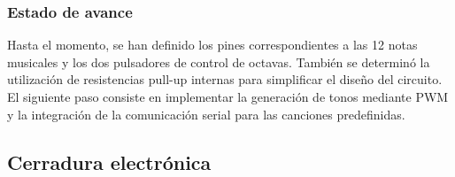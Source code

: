 \subsubsection{Estado de avance}
Hasta el momento, se han definido los pines correspondientes a las 12 notas musicales y los dos pulsadores de control de octavas. También se determinó la utilización de resistencias pull-up internas para simplificar el diseño del circuito. El siguiente paso consiste en implementar la generación de tonos mediante PWM y la integración de la comunicación serial para las canciones predefinidas.

\subsection{Cerradura electrónica}
